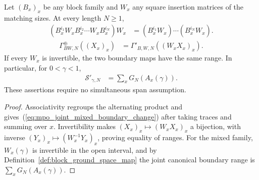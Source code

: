 \begin{lemma}
    \label{thm:mpo_joint_mixed_interior_support}
    \leanok
    Let $(B_x)_x$ be any block family and $W_x$ any square insertion
    matrices of the matching sizes. At every length $N\geq1$,
    \begin{align}
        (B_x^{i_1}W_xB_x^{i_2}\cdots W_xB_x^{i_N})W_x
         & =(B_x^{i_1}W_x)\cdots(B_x^{i_N}W_x).
    \end{align}
    \begin{align}
        \Gamma^{\oplus}_{BW,N}((X_x)_x)
         & =\Gamma'_{B,W,N}((W_xX_x)_x).
        \label{eq:mpo_joint_mixed_boundary_change}
    \end{align}
    If every $W_x$ is invertible, the two boundary maps have the same
    range. In particular, for $0<\gamma<1$,
    \begin{align}
        \mathcal S'_{\gamma,N} & =\sum_xG_N(A_x(\gamma)).
        \label{eq:mpo_joint_mixed_interior_support}
    \end{align}
    These assertions require no simultaneous span assumption.
\end{lemma}
\begin{proof}
    \leanok
    Associativity regroups the alternating product
    and gives~(\ref{eq:mpo_joint_mixed_boundary_change}) after taking
    traces and summing over $x$. Invertibility makes
    $(X_x)_x\mapsto(W_xX_x)_x$ a bijection, with inverse
    $(Y_x)_x\mapsto(W_x^{-1}Y_x)_x$, proving equality of ranges.
    For the mixed family, $W_x(\gamma)$ is invertible in the open
    interval, and by Definition~\ref{def:block_ground_space_map} the
    joint canonical boundary range is $\sum_xG_N(A_x(\gamma))$.
\end{proof}

